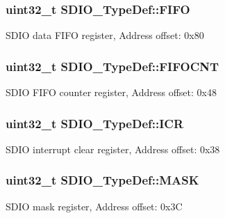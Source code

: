 \subsubsection[{\texorpdfstring{F\+I\+FO}{FIFO}}]{ uint32\+\_\+t S\+D\+I\+O\+\_\+\+Type\+Def\+::\+F\+I\+FO}\hypertarget{struct_s_d_i_o___type_def_ab4757027388ea3a0a6f114d7de2ed4cf}{}\label{struct_s_d_i_o___type_def_ab4757027388ea3a0a6f114d7de2ed4cf}
S\+D\+IO data F\+I\+FO register, Address offset\+: 0x80 
\subsubsection[{\texorpdfstring{F\+I\+F\+O\+C\+NT}{FIFOCNT}}]{ uint32\+\_\+t S\+D\+I\+O\+\_\+\+Type\+Def\+::\+F\+I\+F\+O\+C\+NT}\hypertarget{struct_s_d_i_o___type_def_ae30d52b6556f5d17db8e5cfd2641e7b4}{}\label{struct_s_d_i_o___type_def_ae30d52b6556f5d17db8e5cfd2641e7b4}
S\+D\+IO F\+I\+FO counter register, Address offset\+: 0x48 
\subsubsection[{\texorpdfstring{I\+CR}{ICR}}]{ uint32\+\_\+t S\+D\+I\+O\+\_\+\+Type\+Def\+::\+I\+CR}\hypertarget{struct_s_d_i_o___type_def_ae3c052b85cc438d2b3069f99620e5139}{}\label{struct_s_d_i_o___type_def_ae3c052b85cc438d2b3069f99620e5139}
S\+D\+IO interrupt clear register, Address offset\+: 0x38 
\subsubsection[{\texorpdfstring{M\+A\+SK}{MASK}}]{ uint32\+\_\+t S\+D\+I\+O\+\_\+\+Type\+Def\+::\+M\+A\+SK}\hypertarget{struct_s_d_i_o___type_def_a9a08e405ab985c60ff9031025ab37d31}{}\label{struct_s_d_i_o___type_def_a9a08e405ab985c60ff9031025ab37d31}
S\+D\+IO mask register, Address offset\+: 0x3C 
